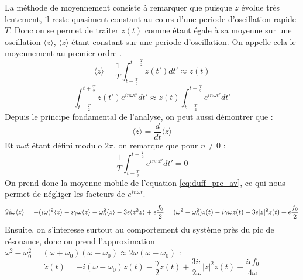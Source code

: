 La méthode de moyennement consiste à remarquer que puisque $z$ évolue très lentement, 
il reste quasiment constant au cours d'une periode d'oscillation rapide $T$. 
Donc on se permet de traiter $z(t)$ comme étant égale à sa moyenne sur une oscillation $\langle z \rangle$, $\langle z \rangle$ étant constant sur une periode d'oscillation. 
On appelle cela le moyennement au premier ordre \cite{rand_lecture_nodate}.
%
\begin{equation}
    \langle z \rangle = \frac{1}{T}\int_{t-\frac{T}{2}}^{t+\frac{T}{2}}{z(t')}dt' \approx  z(t)
\end{equation}
\begin{equation}
    \int_{t-\frac{T}{2}}^{t+\frac{T}{2}}{z(t')e^{in\omega t'}}dt'  \approx z(t) \int_{t-\frac{T}{2}}^{t+\frac{T}{2}}{e^{in\omega t'}}dt'
\end{equation}
%
Depuis le principe fondamental de l'analyse, on peut aussi démontrer que :
%
\begin{equation}
    \langle \dot{z} \rangle = \frac{d}{dt} \langle z \rangle
\end{equation}
%
Et $n \omega t$ étant défini modulo $2\pi$, on remarque que pour $n \neq 0$ :
\begin{equation*}
    \frac{1}{T}\int_{t-\frac{T}{2}}^{t+\frac{T}{2}}{e^{in\omega t'}}dt' = 0
\end{equation*}
%
On prend donc la moyenne mobile de l'equation \eqref{eq:duff_pre_av}, 
ce qui nous permet de négliger les facteurs de $e^{i n\omega t}$.
\begin{dmath}
    2i\omega \langle \dot{z} \rangle = - (i\omega)^2 \langle z \rangle
    - i\gamma\omega \langle z \rangle
    - \omega_0^2 \langle z \rangle 
    - 3 \epsilon \langle z^2 \bar{z} \rangle
    + \epsilon \frac{f_0}{2} \\
    = (\omega^2 - \omega_0^2)z(t) - i\gamma\omega z(t) - 3\epsilon |z|^2 z(t) + \epsilon \frac{f_0}{2}
\end{dmath}
%
Ensuite, on s'interesse surtout au comportement du système près du pic de résonance, 
donc on prend l'approximation $\omega^2 - \omega_0^2 = (\omega + \omega_0)(\omega - \omega_0) \approx 2\omega(\omega - \omega_0)$ :
%
\begin{dmath}
    \dot{z}(t) = -i(\omega - \omega_0)z(t)
    - \frac{\gamma}{2} z(t) + \frac{3i\epsilon}{2\omega}|z|^2z(t) - \frac{i\epsilon f_0}{4\omega}
\end{dmath}
%
